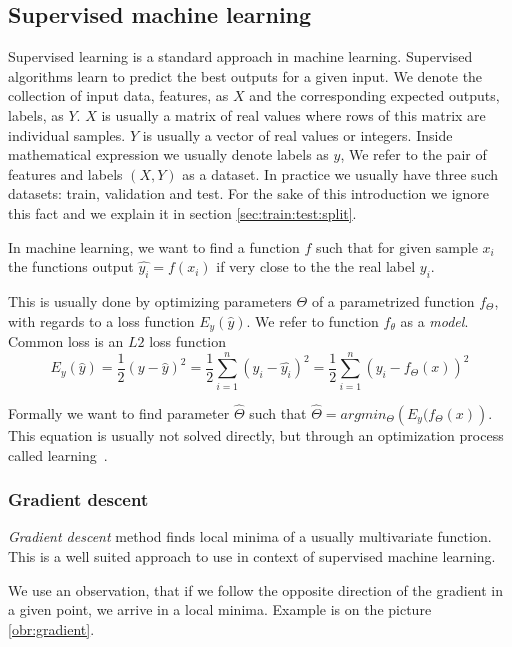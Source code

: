     \subsection{Supervised machine learning}
    
    Supervised learning is a standard approach in machine learning. 
    Supervised algorithms learn to predict the best outputs for a given input.
    We denote the collection of input data, features, as $X$ and the corresponding expected outputs, labels, as $Y$.
    $X$ is usually a matrix of real values where rows of this matrix are individual samples.
    $Y$ is usually a vector of real values or integers. 
    Inside mathematical expression we usually denote labels as $y$,
    We refer to the pair of features and labels $(X, Y)$ as a dataset.
    In practice we usually have three such datasets: train, validation and test. 
    For the sake of this introduction we ignore this fact and we explain it in section \ref{sec:train:test:split}.
    
    In machine learning, we want to find a function $f$ such that for given sample $x_i$
    the functions output $\hat{y_i} = f(x_i)$ if very close to the the real label $y_i$.
    
    This is usually done by optimizing parameters $\Theta$ of a parametrized function $f_\Theta$,
    with regards to a loss function $E_y(\hat{y})$. 
    We refer to function $f_\theta$ as a \textit{model}.
    Common loss is an $L2$ loss function 
    $$E_y(\hat{y}) = \frac{1}{2}(y - \hat{y})^2 = \frac{1}{2}\sum_{i=1}^n (y_i - \hat{y_i})^2= \frac{1}{2}\sum_{i=1}^n (y_i - f_\Theta(x))^2$$  
    
    Formally we want to find parameter $\hat{\Theta}$ such that $\hat{\Theta} = argmin_\Theta \left(E_y(f_\Theta(x) \right)$. 
    This equation is usually not solved directly, but through an optimization process called learning~\cite{Goodfellow-et-al-2016}. %
    
    \subsubsection{Gradient descent}

    \textit{Gradient descent} method finds local minima of a usually multivariate function. 
    This is a well suited approach to use in context of supervised machine learning. 
    
    We use an observation, that if we follow the opposite direction of the gradient in a given point, 
    we arrive in a local minima. Example is on the picture \ref{obr:gradient}.
    

